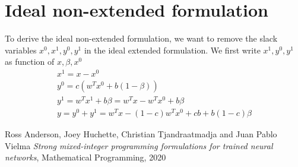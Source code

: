 \documentclass{article}
\begin{document}
\section{Ideal non-extended formulation}
To derive the ideal non-extended formulation, we want to remove the slack variables $x^0, x^1, y^0, y^1$ in the ideal extended formulation. We first write $x^1, y^0, y^1$ as function of $x, \beta, x^0$
\begin{subequations}
\begin{align}
	x^1 = x - x^0\\
	y^0 = c(w^Tx^0 + b(1-\beta))\\
	y^1 = w^Tx^1 + b\beta = w^Tx - w^Tx^0 + b\beta\\
	y = y^0 + y^1 = w^Tx - (1-c)w^Tx^0 + cb + b(1-c)\beta
\end{align}
\end{subequations}

\begin{thebibliography}{9}
	Ross Anderson, Joey Huchette, Christian Tjandraatmadja and Juan Pablo Vielma \textit{Strong mixed-integer programming formulations for trained neural networks}, Mathematical Programming, 2020
\end{thebibliography}
\end{document}
